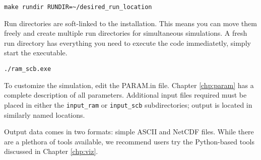 \begin{verbatim}
make rundir RUNDIR=~/desired_run_location
\end{verbatim}

Run directories are soft-linked to the installation.  This means you can move them freely and create multiple run directories for simultaneous simulations. A fresh run directory has everything you need to execute the code immediatetly, simply start the executable.

\begin{verbatim}
./ram_scb.exe
\end{verbatim}

To customize the simulation, edit the PARAM.in file.  Chapter \ref{chp:param} has a complete description of all parameters.  Additional input files required must be placed in either the {\tt input\_ram} or {\tt input\_scb} subdirectories; output is located in similarly named locations.

Output data comes in two formats: simple ASCII and NetCDF files.  While there are a plethora of tools available, we recommend users try the Python-based tools discussed in Chapter \ref{chp:viz}.